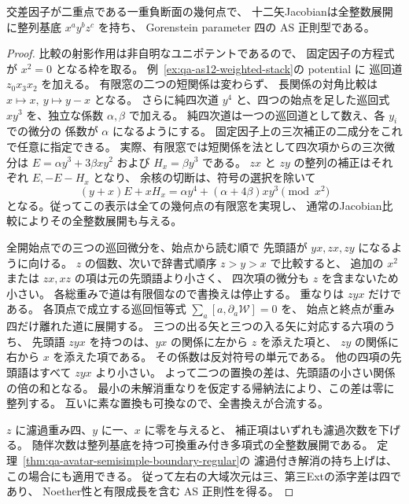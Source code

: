 \begin{theorem}[一重負断面の二重点境界におけるAS正則性]
\label{thm:qa-avatar-jordan-boundary-regular}
交差因子が二重点である一重負断面の幾何点で、
十二矢Jacobianは全整数展開に整列基底 $x^a y^b z^c$ を持ち、
Gorenstein parameter 四の AS 正則型である。
\end{theorem}
\begin{proof}
比較の射影作用は非自明なユニポテントであるので、
固定因子の方程式が $x^2=0$ となる枠を取る。
例~\ref{ex:qa-as12-weighted-stack}の potential に
巡回道 $z_0x_3x_2$ を加える。
有限窓の二つの短関係は変わらず、
長関係の対角比較は $x\mapsto x,\ y\mapsto y-x$ となる。
さらに純四次道 $y^4$ と、四つの始点を足した巡回式
$xy^3$ を、独立な係数 $\alpha,\beta$ で加える。
純四次道は一つの巡回道として数え、各 $y_i$ での微分の
係数が $\alpha$ になるようにする。
固定因子上の三次補正の二成分をこれで任意に指定できる。
実際、有限窓では短関係を法として四次項からの三次微分は
$E=\alpha y^3+3\beta xy^2$ および $H_x=\beta y^3$ である。
$zx$ と $zy$ の整列の補正はそれぞれ $E,-E-H_x$ となり、
余核の切断は、符号の選択を除いて
\[
 (y+x)E+xH_x = \alpha y^4+(\alpha+4\beta)xy^3
              \pmod{x^2}
\]
となる。従ってこの表示は全ての幾何点の有限窓を実現し、
通常のJacobian比較によりその全整数展開も与える。

全開始点での三つの巡回微分を、始点から読む順で
先頭語が $yx,zx,zy$ になるように向ける。
$z$ の個数、次いで辞書式順序 $z>y>x$ で比較すると、
追加の $x^2$ または $zx,xz$ の項は元の先頭語より小さく、
四次項の微分も $z$ を含まないため小さい。
各総重みで道は有限個なので書換えは停止する。
重なりは $zyx$ だけである。
各頂点で成立する巡回恒等式
$\sum_a[a,\partial_a\mathcal W]=0$ を、
始点と終点が重み四だけ離れた道に展開する。
三つの出る矢と三つの入る矢に対応する六項のうち、
先頭語 $zyx$ を持つのは、$yx$ の関係に左から $z$ を添えた項と、
$zy$ の関係に右から $x$ を添えた項である。
その係数は反対符号の単元である。
他の四項の先頭語はすべて $zyx$ より小さい。
よって二つの置換の差は、先頭語の小さい関係の倍の和となる。
最小の未解消重なりを仮定する帰納法により、この差は零に整列する。
互いに素な置換も可換なので、全書換えが合流する。

$z$ に濾過重み四、$y$ に一、$x$ に零を与えると、
補正項はいずれも濾過次数を下げる。
随伴次数は整列基底を持つ可換重み付き多項式の全整数展開である。
定理~\ref{thm:qa-avatar-semisimple-boundary-regular}の
濾過付き解消の持ち上げは、この場合にも適用できる。
従って左右の大域次元は三、第三Extの添字差は四であり、
Noether性と有限成長を含む AS 正則性を得る。
\end{proof}

